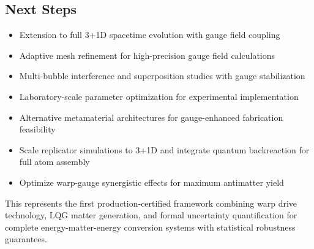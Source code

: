 \documentclass[11pt]{article}
\begin{document}
\subsection{Next Steps}
\begin{itemize}
\item Extension to full 3+1D spacetime evolution with gauge field coupling
\item Adaptive mesh refinement for high-precision gauge field calculations
\item Multi-bubble interference and superposition studies with gauge stabilization
\item Laboratory-scale parameter optimization for experimental implementation
\item Alternative metamaterial architectures for gauge-enhanced fabrication feasibility
\item Scale replicator simulations to 3+1D and integrate quantum backreaction for full atom assembly
\item Optimize warp-gauge synergistic effects for maximum antimatter yield
\end{itemize}

This represents the first production-certified framework combining warp drive technology, LQG matter generation, and formal uncertainty quantification for complete energy-matter-energy conversion systems with statistical robustness guarantees.
\end{document}
